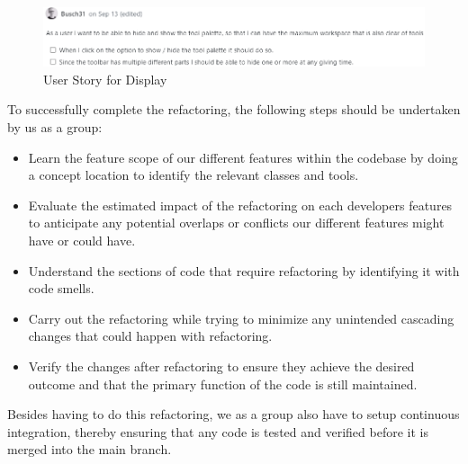 \begin{figure}[htbp]
    \centering
    \includegraphics[width=\linewidth]{pic/Tool_palette_Display.png}
    \caption{User Story for Display}
    \label{fig:tool-palette-display}
\end{figure}

To successfully complete the refactoring, the following steps should be undertaken by us as a group:
\begin{itemize}
    \item Learn the feature scope of our different features within the codebase by doing a concept location to identify the relevant classes and tools.
    \item Evaluate the estimated impact of the refactoring on each developers features to anticipate any potential overlaps or conflicts our different features might have or could have.
    \item Understand the sections of code that require refactoring by identifying it with code smells.
    \item Carry out the refactoring while trying to minimize any unintended cascading changes that could happen with refactoring.
    \item Verify the changes after refactoring to ensure they achieve the desired outcome and that the primary function of the code is still maintained.
\end{itemize}

Besides having to do this refactoring, we as a group also have to setup continuous integration,
thereby ensuring that any code is tested and verified before it is merged into the main branch.
